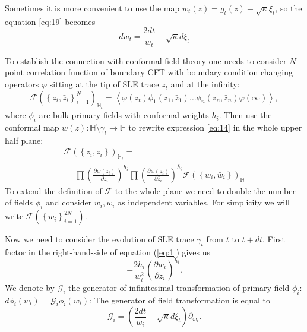 \documentclass[12pt]{article}
\begin{document}
\begin{itemize}
Sometimes it is more convenient to use the map $w_{t} (z)=g_{t}(z)-\sqrt{\kappa}\xi_{t}$, so the equation \eqref{eq:19} becomes
\begin{equation}
  \label{eq:20}
       d w _{t}= \frac{2dt}{w_{t} }-\sqrt{\kappa}d\xi_{t}  
\end{equation}

To establish the connection with conformal field theory one needs to
consider $N$-point correlation function of boundary CFT with boundary
condition changing operators $\varphi$ sitting at the tip of SLE trace
$z_t$ and at the infinity:
\begin{equation}
  \mathcal{F}(\left\{z_{i},\bar z_{i}\right\}_{i=1}^{N})_{\mathbb{H}_{t}}=
\left<\varphi(z_{t}) \phi_{1}(z_{1},\bar z_{1}) \dots \phi_{n}(z_{n},\bar z_{n})
      \varphi(\infty)\right>,
    \label{eq:14}
\end{equation}
where $\phi_{i}$ are bulk primary fields with conformal weights $h_i$.
Then use the conformal map  $w(z):\mathbb{H}\setminus\gamma_{t}\to \mathbb{H}$ to rewrite expression \eqref{eq:14} in the whole upper half plane:
\begin{multline}
  \mathcal{F}(\left\{z_{i},\bar z_{i}\right\})_{\mathbb{H}_{t}}=\\
  =\prod \left(\frac{\partial w(z_{i})}{\partial z_{i}}\right)^{h_{i}} 
  \prod \left(\frac{\partial \bar w(\bar z_{i})}{\partial \bar z_{i}}\right)^{\bar h_i}
  \mathcal{F}(\left\{w_{i}, \bar w_{i}\right\})_{\mathbb{H}}
  \label{eq:4}
\end{multline}
To extend the definition of $\mathcal{F}$ to the whole plane we need
to double the number of fields $\phi_{i}$
\cite{cardy2004boundary,cardy1984conformal} and consider $w_{i},\bar
w_{i}$ as independent variables. For simplicity we will write
$\mathcal{F}(\left\{w_{i}\right\}_{i=1}^{2N})$.

Now we need to consider the evolution of SLE trace $\gamma_{t}$ from  $t$ to $t+ dt$. First factor in the right-hand-side of equation (\ref{eq:1}) gives us
\begin{equation*}
  -\frac{2h_{i}}{w_{i}^{2}}\left(\frac{\partial w_{i}}{\partial z_{i}}\right)^{h_{i}}.
\end{equation*}
We denote by $\mathcal{G}_{i}$ the generator of infinitesimal
transformation of primary field $\phi_{i}$:$d\phi_{i}(w_{i}) =
\mathcal{G}_{i}\phi_{i}(w_{i})$:
 The generator of field transformation is equal to
\begin{equation}
  \mathcal{G}_{i}=\left(\frac{2dt}{w_{i}}-\sqrt{\kappa} d\xi_{t}\right) \partial_{w_{i}}.
  \label{eq:11}
\end{equation}


\end{itemize}
\end{document}
